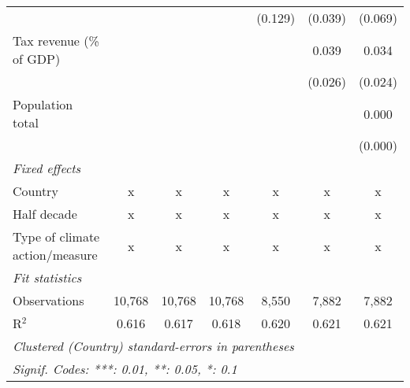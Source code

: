 \begin{tabular}{lcccccc}
                                                       &         &               &                & (0.129)        & (0.039)        & (0.069)\\   
   Tax revenue (\% of GDP)                             &         &               &                &                & 0.039          & 0.034\\   
                                                       &         &               &                &                & (0.026)        & (0.024)\\   
   Population total                                    &         &               &                &                &                & 0.000\\   
                                                       &         &               &                &                &                & (0.000)\\   
   \emph{Fixed effects}\\
   Country                                             & x       & x             & x              & x              & x              & x\\  
   Half decade                                         & x       & x             & x              & x              & x              & x\\  
   Type of climate action/measure                      & x       & x             & x              & x              & x              & x\\  
   \midrule \emph{Fit statistics}\\
   Observations                                        & 10,768  & 10,768        & 10,768         & 8,550          & 7,882          & 7,882\\  
   R$^2$                                               & 0.616   & 0.617         & 0.618          & 0.620          & 0.621          & 0.621\\  
   \midrule
   \multicolumn{7}{l}{\emph{Clustered (Country) standard-errors in parentheses}}\\
   \multicolumn{7}{l}{\emph{Signif. Codes: ***: 0.01, **: 0.05, *: 0.1}}\\
\end{tabular}
\par\endgroup


